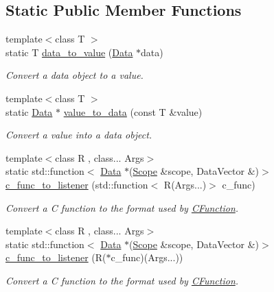 \subsection*{Static Public Member Functions}
\begin{DoxyCompactItemize}
\item 
{\footnotesize template$<$class T $>$ }\\static T \hyperlink{structcreek_1_1_resolver_a5cd23dbbade2472d7cb5ef9407f16963}{data\+\_\+to\+\_\+value} (\hyperlink{classcreek_1_1_data}{Data} $\ast$data)
\begin{DoxyCompactList}\small\item\em Convert a data object to a value. \end{DoxyCompactList}\item 
{\footnotesize template$<$class T $>$ }\\static \hyperlink{classcreek_1_1_data}{Data} $\ast$ \hyperlink{structcreek_1_1_resolver_abd3d044471c8d44073bc41bf235b4c39}{value\+\_\+to\+\_\+data} (const T \&value)
\begin{DoxyCompactList}\small\item\em Convert a value into a data object. \end{DoxyCompactList}\item 
{\footnotesize template$<$class R , class... Args$>$ }\\static std\+::function$<$ \hyperlink{classcreek_1_1_data}{Data} $\ast$(\hyperlink{classcreek_1_1_scope}{Scope} \&scope, Data\+Vector \&)$>$ \hyperlink{structcreek_1_1_resolver_aa2ae4cfdfa4dfe12d6c5eb303900e668}{c\+\_\+func\+\_\+to\+\_\+listener} (std\+::function$<$ R(Args...)$>$ c\+\_\+func)
\begin{DoxyCompactList}\small\item\em Convert a C function to the format used by {\ttfamily \hyperlink{classcreek_1_1_c_function}{C\+Function}}. \end{DoxyCompactList}\item 
{\footnotesize template$<$class R , class... Args$>$ }\\static std\+::function$<$ \hyperlink{classcreek_1_1_data}{Data} $\ast$(\hyperlink{classcreek_1_1_scope}{Scope} \&scope, Data\+Vector \&)$>$ \hyperlink{structcreek_1_1_resolver_a769f63813a3e39feebc61f4101a08932}{c\+\_\+func\+\_\+to\+\_\+listener} (R($\ast$c\+\_\+func)(Args...))
\begin{DoxyCompactList}\small\item\em Convert a C function to the format used by {\ttfamily \hyperlink{classcreek_1_1_c_function}{C\+Function}}. \end{DoxyCompactList}\end{DoxyCompactItemize}


